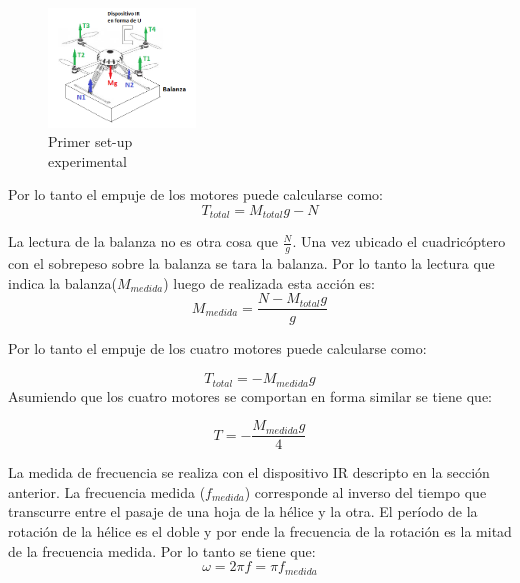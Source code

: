\documentclass[main]{subfiles}
\begin{document}
\begin{figure}
\vspace{-25pt}
  \begin{center}
    \includegraphics[width=0.35\textwidth]{./pics_motores/set1.png}
  \end{center}
  \vspace{-25pt}
  \caption{Primer set-up\\ experimental}
  \label{fig:setup1}
\end{figure}

Por lo tanto el empuje de los motores puede calcularse como:
\begin{equation}
T_{total}=M_{total}g-N
\end{equation}

La lectura de la balanza no es otra cosa que $\frac{N}{g}$.
Una vez ubicado el cuadric\'optero con el sobrepeso sobre la balanza se tara la balanza. Por lo tanto la lectura que indica la balanza($M_{medida}$) luego de realizada esta acci\'on es:
\begin{equation}
M_{medida}=\frac{N-M_{total}g}{g}
\end{equation}

Por lo tanto el empuje de los cuatro motores puede calcularse como:

\begin{equation}
T_{total}=-M_{medida}g
\end{equation}
Asumiendo que los cuatro motores se comportan en forma similar se tiene que:

\begin{equation}
T=-\frac{M_{medida}g}{4}
\end{equation}

La medida de frecuencia se realiza con el dispositivo IR descripto en la secci\'on anterior. La frecuencia medida ($f_{medida}$) corresponde al inverso del tiempo que transcurre entre el pasaje de una hoja de la h\'elice y la otra. El per\'iodo de la rotaci\'on de la h\'elice es el doble y por ende la frecuencia de la rotaci\'on es la mitad de la frecuencia medida. Por lo tanto se tiene que:
\begin{equation}
\label{eq:omega_ir}
\omega=2\pi f=\pi f_{medida}
\end{equation}
\end{document}
